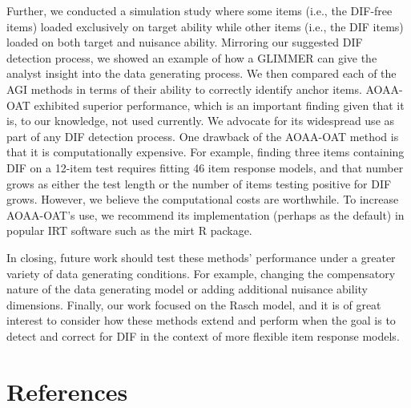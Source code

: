\documentclass[
  english,
  man,floatsintext]{apa6}
\begin{document}
Further, we conducted a simulation study where some items (i.e., the DIF-free items) loaded exclusively on target ability while other items (i.e., the DIF items) loaded on both target and nuisance ability. Mirroring our suggested DIF detection process, we showed an example of how a GLIMMER can give the analyst insight into the data generating process. We then compared each of the AGI methods in terms of their ability to correctly identify anchor items. AOAA-OAT exhibited superior performance, which is an important finding given that it is, to our knowledge, not used currently. We advocate for its widespread use as part of any DIF detection process. One drawback of the AOAA-OAT method is that it is computationally expensive. For example, finding three items containing DIF on a 12-item test requires fitting 46 item response models, and that number grows as either the test length or the number of items testing positive for DIF grows. However, we believe the computational costs are worthwhile. To increase AOAA-OAT's use, we recommend its implementation (perhaps as the default) in popular IRT software such as the mirt R package.

In closing, future work should test these methods' performance under a greater variety of data generating conditions. For example, changing the compensatory nature of the data generating model or adding additional nuisance ability dimensions. Finally, our work focused on the Rasch model, and it is of great interest to consider how these methods extend and perform when the goal is to detect and correct for DIF in the context of more flexible item response models.

\clearpage

\hypertarget{references}{%
\section{References}\label{references}}

\begingroup
\setlength{\parindent}{-0.5in}
\setlength{\leftskip}{0.5in}
\end{document}
